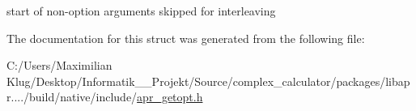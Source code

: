 start of non-\/option arguments skipped for interleaving 

The documentation for this struct was generated from the following file\+:\begin{DoxyCompactItemize}
\item 
C\+:/\+Users/\+Maximilian Klug/\+Desktop/\+Informatik\+\_\+\_\+\+Projekt/\+Source/complex\+\_\+calculator/packages/libapr..../build/native/include/\mbox{\hyperlink{apr__getopt_8h}{apr\+\_\+getopt.\+h}}\end{DoxyCompactItemize}

